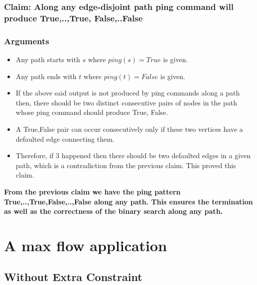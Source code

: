 \documentclass{article}
\begin{document}
\subsubsection{Claim: Along any edge-disjoint path ping command will produce True,..,True, False,..False}
\subsubsection{Arguments}
\begin{itemize}
\item Any path starts with $s$ where $ping(s) = True$ is given.
\item Any path ends with $t$ where $ping(t) = False$ is given.
\item If the above said output is not produced by ping commands along a path then, there should be two distinct consecutive pairs of nodes in the path whose ping command should produce True, False. 
\item A True,False pair can occur consecutively only if these two vertices have a defaulted edge connecting them.
\item Therefore, if $3$ happened then there should be two defaulted edges in a given path, which is a contradiction from the previous claim. This proved this claim.
\end{itemize}    
{\bf From the previous claim we have the ping pattern True,..,True,False,..,False along any path. This ensures the termination as well as the correctness of the binary search along any path.}
\newpage
\section{A max flow application}
\subsection{Without Extra Constraint}
\end{document}
